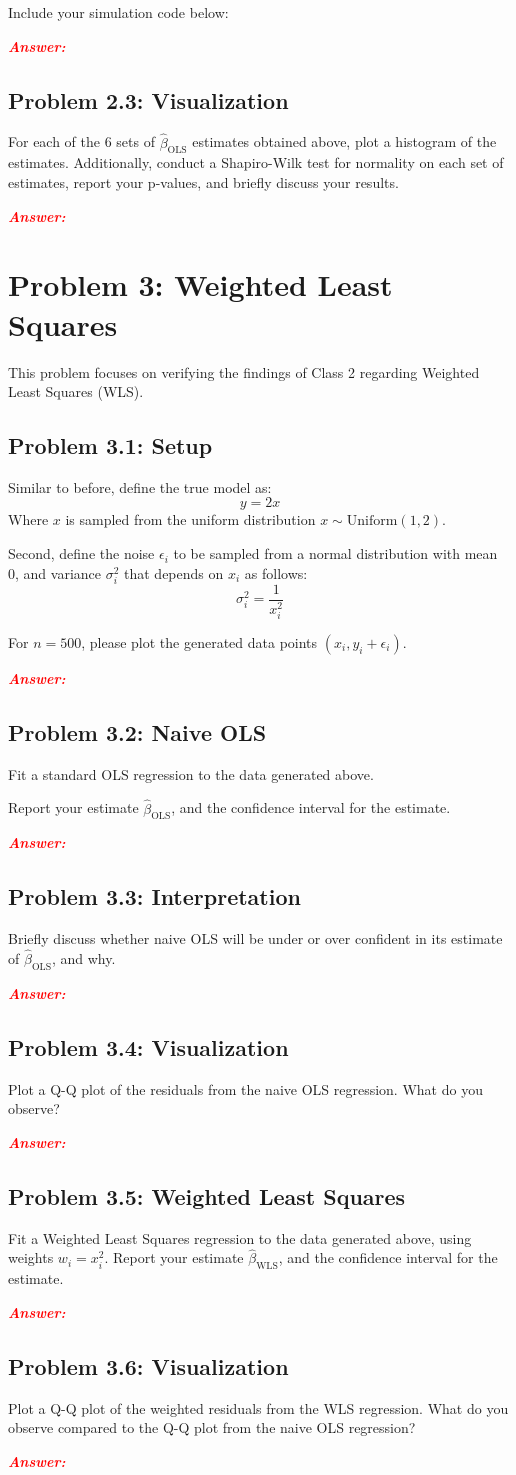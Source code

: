 \documentclass[11pt, letterpaper]{article}
\newcommand{\problem}[1]{\section*{Problem #1}}
\newcommand{\subproblem}[1]{\subsection*{Problem #1}}
\newcommand{\answer}{\textbf{\textit{\textcolor{red}{Answer:}}}\\}
\begin{document}
Include your simulation code below:

\answer

\subproblem{2.3: Visualization}

For each of the 6 sets of $\hat{\beta}_{\text{OLS}}$ estimates obtained above, plot a histogram of the estimates.
Additionally, conduct a Shapiro-Wilk test for normality on each set of estimates,
report your p-values, and briefly discuss your results.

\answer

\problem{3: Weighted Least Squares}

This problem focuses on verifying the findings of Class 2 regarding
Weighted Least Squares (WLS).

\subproblem{3.1: Setup}

Similar to before, define the true model as:
$$
y = 2x
$$
Where $x$ is sampled from the uniform distribution $x \sim \text{Uniform}(1, 2)$.

Second, define the noise $\epsilon_i$ to be sampled from a normal distribution with mean 0,
and variance $\sigma_i^2$ that depends on $x_i$ as follows:
$$
\sigma_i^2 = \frac{1}{x_i^2}
$$

For $n=500$, please plot the generated data points $(x_i, y_i + \epsilon_i)$.

\answer

\subproblem{3.2: Naive OLS}

Fit a standard OLS regression to the data generated above.

Report your estimate $\hat{\beta}_{\text{OLS}}$, and the confidence interval for the estimate.

\answer

\subproblem{3.3: Interpretation}

Briefly discuss whether naive OLS will be under or over confident in its estimate of $\hat{\beta}_{\text{OLS}}$,
and why.

\answer

\subproblem{3.4: Visualization}

Plot a Q-Q plot of the residuals from the naive OLS regression. What do you observe?

\answer

\subproblem{3.5: Weighted Least Squares}

Fit a Weighted Least Squares regression to the data generated above, using weights $w_i = x_i^2$.
Report your estimate $\hat{\beta}_{\text{WLS}}$, and the confidence interval for the estimate.

\answer

\subproblem{3.6: Visualization}

Plot a Q-Q plot of the weighted residuals from the WLS regression. What do you observe compared
to the Q-Q plot from the naive OLS regression?

\answer
\end{document}
